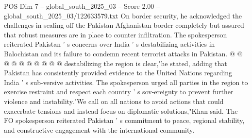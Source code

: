 \begin{textsample}{POS Dim 7 – global\_south\_2025\_03 – Score 2.00 – global\_south\_2025\_03/122633579.txt}
On border security, he acknowledged the challenges in sealing off the Pakistan-Afghanistan border completely but assured that robust measures are in place to counter infiltration.
The spokesperson reiterated Pakistan ' s concerns over India ' s destabilizing activities in Balochistan and its failure to condemn recent terrorist attacks in Pakistan. @ @ @ @ @ @ @ @ @ @ destabilizing the region is clear,"he stated, adding that Pakistan has consistently provided evidence to the United Nations regarding India ' s sub-versive activities.
The spokesperson urged all parties in the region to exercise restraint and respect each country ' s sov-ereignty to prevent further violence and instability."We call on all nations to avoid actions that could exacerbate tensions and instead focus on diplomatic solutions,"Khan said.
The FO spokesperson reiterated Pakistan ' s commitment to peace, regional stability, and constructive engagement with the international community.

\end{textsample}
